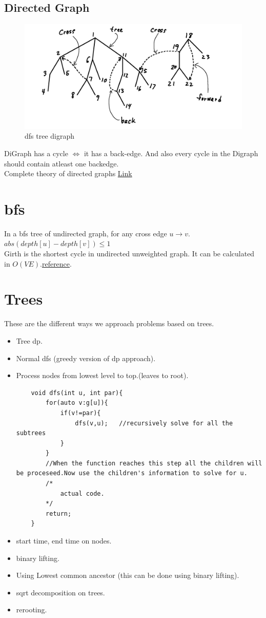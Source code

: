 \documentclass[../Notes.tex]{subfiles}
\begin{document}
\subsection{Directed Graph}
\begin{figure}[h!]
  \includegraphics[width=\linewidth]{"./Material/Digraph dfstree"}
  \caption{dfs tree digraph}
  \label{fig:digraph}
\end{figure}
DiGraph has a cycle $\iff$ it has a back-edge. And also every cycle in the Digraph should contain atleast one backedge.\\
Complete theory of directed graphs \href{./Material/Directed Graphs}{Link}

\section{bfs}
In a bfs tree of undirected graph, for any cross edge $u\rightarrow v$. $abs(depth[u]-depth[v])\leq 1$\\

Girth is the shortest cycle in undirected unweighted graph. It can be calculated in $O(VE)$.\href{./Material/Girth.pdf}{reference}.

\section{Trees}

These are the different ways we approach problems based on trees.
\begin{itemize}
	\item Tree dp.
	\item Normal dfs (greedy version of dp approach).
	\item Process nodes from lowest level to top.(leaves to root).
	\begin{lstlisting}
	void dfs(int u, int par){
		for(auto v:g[u]){
			if(v!=par){
				dfs(v,u);	//recursively solve for all the subtrees
			}
		}
		//When the function reaches this step all the children will be proceseed.Now use the children's information to solve for u.
		/*
			actual code.
		*/
		return;
	}
	\end{lstlisting}
	\item start time, end time on nodes.
	\item binary lifting.
	\item Using Lowest common ancestor (this can be done using binary lifting).
	\item sqrt decomposition on trees.
	\item rerooting.
\end{itemize}
\end{document}
